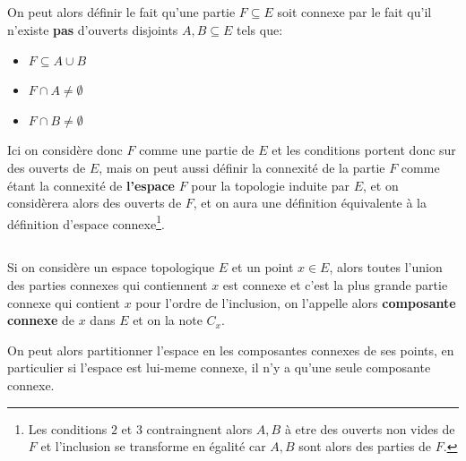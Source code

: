 \subsection*{}
On peut alors définir le fait qu'une partie \(F \subseteq E\) soit connexe par le fait qu'il n'existe \textbf{pas} d'ouverts disjoints \(A, B \subseteq E\) tels que:
\begin{itemize}
   \item \(F \subseteq A \cup B\)
   \item \(F \cap A \neq \emptyset\)
   \item \(F \cap B \neq \emptyset\)
\end{itemize}
Ici on considère donc \(F\) comme une partie de \(E\) et les conditions portent donc sur des ouverts de \(E\), mais on peut aussi définir la connexité de la partie \(F\) comme étant la connexité de \textbf{l'espace} \(F\) pour la topologie induite par \(E\), et on considèrera alors des ouverts de \(F\), et on aura une définition équivalente à la définition d'espace connexe\footnote[1]{Les conditions \(2\) et \(3\) contraingnent alors \(A, B\) à etre des ouverts non vides de \(F\) et l'inclusion se transforme en égalité car \(A, B\) sont alors des parties de \(F\).}.

\subsection*{}
Si on considère un espace topologique \(E\) et un point \(x \in E\), alors toutes l'union des parties connexes qui contiennent \(x\) est connexe et c'est la plus grande partie connexe qui contient \(x\) pour l'ordre de l'inclusion, on l'appelle alors \textbf{composante connexe} de \(x\) dans \(E\) et on la note \(C_x\).\<

On peut alors partitionner l'espace en les composantes connexes de ses points, en particulier si l'espace est lui-meme connexe, il n'y a qu'une seule composante connexe.

